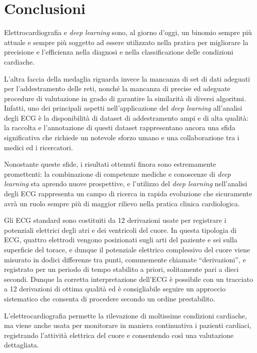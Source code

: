 \chapter{Conclusioni}
\label{chap:conclusioni}

Elettrocardiografia e \textit{deep learning} sono, al giorno d'oggi, un binomio sempre più attuale e sempre più soggetto ad essere utilizzato nella pratica per migliorare la precisione e l'efficienza nella diagnosi e nella classificazione delle condizioni cardiache.

L'altra faccia della medaglia riguarda invece la mancanza di set di dati adeguati per l'addestramento delle reti, nonché la mancanza di precise ed adeguate procedure di valutazione in grado di garantire la similarità di diversi algoritmi. Infatti, uno dei principali aspetti nell'applicazione del \textit{deep learning} all'analisi degli ECG è la disponibilità di dataset di addestramento ampi e di alta qualità: la raccolta e l'annotazione di questi dataset rappresentano ancora una sfida significativa che richiede un notevole sforzo umano e una collaborazione tra i medici ed i ricercatori.

Nonostante queste sfide, i risultati ottenuti finora sono estremamente promettenti: la combinazione di competenze mediche e conoscenze di \textit{deep learning} sta aprendo nuove prospettive, e l'utilizzo del \textit{deep learning} nell'analisi degli ECG rappresenta un campo di ricerca in rapida evoluzione che sicuramente avrà un ruolo sempre più di maggior rilievo nella pratica clinica cardiologica.

Gli ECG standard sono costituiti da 12 derivazioni usate per registrare i potenziali elettrici degli atri e dei ventricoli del cuore. In questa tipologia di ECG, quattro elettrodi vengono posizionati sugli arti del paziente e sei sulla superficie del torace, e dunque il potenziale elettrico complessivo del cuore viene misurato in dodici differenze tra punti, comunemente chiamate ``derivazioni'', e registrato per un periodo di tempo stabilito a priori, solitamente pari a dieci secondi. Dunque la corretta interpretazione dell'ECG è possibile con un tracciato a 12 derivazioni di ottima qualità ed è consigliabile seguire un approccio sistematico che consenta di procedere secondo un ordine prestabilito.

L'elettrocardiografia permette la rilevazione di moltissime condizioni cardiache, ma viene anche usata per monitorare in maniera continuativa i pazienti cardiaci, registrando l'attività elettrica del cuore e consentendo così una valutazione dettagliata.

